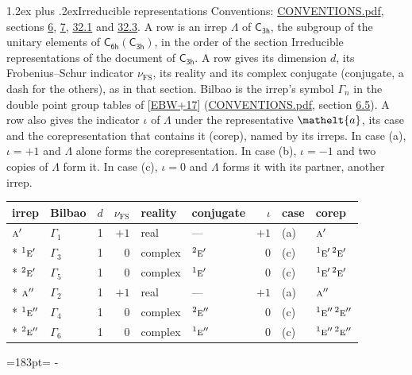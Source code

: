 \documentclass[10pt,a4paper]{article}
\makeatletter
\renewcommand\section{\@startsection{section}{1}{\z@}{-3ex plus -1ex minus -.2ex}%
  {1.2ex plus .2ex}{\normalfont\large\sffamily\bfseries\color{parttitle}}}
\newcommand{\needspace}[1]{\par\penalty-100\begingroup\dimen0=#1\relax\dimen2=\pagegoal
  \advance\dimen2-\pagetotal\ifdim\dimen0>\dimen2\relax\ifdim\dimen2>0pt\vfil\break\fi\fi
  \endgroup}
\numberwithin{equation}{section}
\newcommand{\eltfont}[1]{{\let\sigma\eltsigma\mathelt{#1}}}
\newcommand{\grp}[1]{\mathsf{#1}}
\newcommand{\irr}[1]{\text{\normalfont\scshape #1}}
\newcommand{\conjpair}[1]{{}^{#1}}
\newcommand{\elt}[1]{\eltfont{#1}}
\newcommand{\fsind}{\nu_{\mathrm{FS}}}
\makeatother
\begin{document}
\section{Irreducible representations}\label{s:irreps}
Conventions: \href{../../CONVENTIONS.pdf}{CONVENTIONS.pdf}, sections \href{../../../rotation/CONVENTIONS.pdf\#conv.6}{6}, \href{../../../rotation/CONVENTIONS.pdf\#conv.7}{7}, \href{../../CONVENTIONS.pdf\#conv.32.1}{32.1} and \href{../../CONVENTIONS.pdf\#conv.32.3}{32.3}.
\leavevmode\label{n:irrep.Delta}A row is an irrep $\Lambda$ of $\grp{C_{3h}}$, the subgroup of the unitary elements of $\grp{C_{6h}}(\grp{C_{3h}})$, in the order of the section Irreducible representations of the document of \href{../../../rotation/data/pdf/C3h.pdf}{$\grp{C_{3h}}$}. \label{n:index.dimension}\label{n:index.frobenius}\label{n:head.irrep}\label{n:head.reality}\label{n:head.conjugate}A row gives its dimension $d$, its Frobenius--Schur indicator $\fsind$, its reality and its complex conjugate (conjugate, a dash for the others), as in that section. \label{n:head.bilbao}\label{n:irrep.alias.gamma}Bilbao is the irrep's symbol $\Gamma_n$ in the double point group tables of [\href{../../../REFERENCES.pdf\#ref.EBW+17}{EBW+17}] (\href{../../CONVENTIONS.pdf}{CONVENTIONS.pdf}, section \href{../../../rotation/CONVENTIONS.pdf\#conv.6.5}{6.5}). \label{n:head.case.corep}\label{n:head.corep}A row also gives the indicator $\iota$ of $\Lambda$ under the representative $\elt{a}$, its case and the corepresentation that contains it (corep), named by its irreps. In case (a), $\iota = +1$ and $\Lambda$ alone forms the corepresentation. In case (b), $\iota = -1$ and two copies of $\Lambda$ form it. In case (c), $\iota = 0$ and $\Lambda$ forms it with its partner, another irrep.
\setlength{\emergencystretch}{2em}\par\setlength{\emergencystretch}{0pt}
{\small\renewcommand{\arraystretch}{1.25}\setlength{\tabcolsep}{4pt}\begin{longtable}{@{}llrrllrll@{}}\toprule
irrep & Bilbao & $d$ & $\fsind$ & reality & conjugate & $\iota$ & case & corep\\\midrule\endhead
\bottomrule\endfoot\endlastfoot
$\irr{a}'$ & $\Gamma_{1}$ & 1 & $+1$ & real & --- & $+1$ & (a) & $\irr{a}'$\\*
$\conjpair{1}\irr{e}'$ & $\Gamma_{3}$ & 1 & $0$ & complex & $\conjpair{2}\irr{e}'$ & $0$ & (c) & $\conjpair{1}\irr{e}'\,\conjpair{2}\irr{e}'$\\*
$\conjpair{2}\irr{e}'$ & $\Gamma_{5}$ & 1 & $0$ & complex & $\conjpair{1}\irr{e}'$ & $0$ & (c) & $\conjpair{1}\irr{e}'\,\conjpair{2}\irr{e}'$\\*
$\irr{a}''$ & $\Gamma_{2}$ & 1 & $+1$ & real & --- & $+1$ & (a) & $\irr{a}''$\\*
$\conjpair{1}\irr{e}''$ & $\Gamma_{4}$ & 1 & $0$ & complex & $\conjpair{2}\irr{e}''$ & $0$ & (c) & $\conjpair{1}\irr{e}''\,\conjpair{2}\irr{e}''$\\*
$\conjpair{2}\irr{e}''$ & $\Gamma_{6}$ & 1 & $0$ & complex & $\conjpair{1}\irr{e}''$ & $0$ & (c) & $\conjpair{1}\irr{e}''\,\conjpair{2}\irr{e}''$\\
\bottomrule\end{longtable}}
\needspace{183pt}
\end{document}
